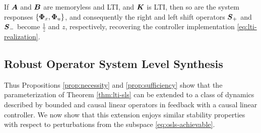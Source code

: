 \begin{remark}
If $\boldsymbol{A}$ and $\boldsymbol{B}$ are memoryless and LTI, and $\boldsymbol{K}$ is LTI, then so are the system responses $\left\{\boldsymbol{\Phi}_x,\boldsymbol{\Phi}_u\right\}$, and consequently the right and left shift operators $\boldsymbol{S}_+$ and $\boldsymbol{S}_-$ become $\frac{1}{z}$ and $z$, respectively, recovering the controller implementation \eqref{eq:lti-realization}.
\end{remark}

\subsection{Robust Operator System Level Synthesis}
Thus Propositions \ref{prop:necessity} and \ref{prop:sufficiency} show that the parameterization of Theorem \ref{thm:lti-sls} can be extended to a class of dynamics described by bounded and causal linear operators in feedback with a causal linear controller.  We now show that this extension enjoys similar stability properties with respect to perturbations from the subspace \eqref{eq:osls-achievable}.

